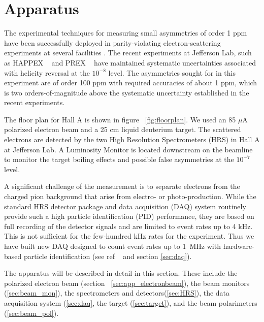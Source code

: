 
\section{Apparatus}\label{sec:apparatus}

\par The experimental techniques for measuring small 
asymmetries of order 1 ppm have been successfully deployed in
parity-violating electron-scattering experiments at several
facilities \cite{Prescott,batesc12,SAMPLEsff,HAPPEXsff,G0sff,prex}.
The recent experiments at Jefferson Lab, such as HAPPEX ~\cite{HAPPEXsff}
and PREX ~\cite{prex} have maintained systematic 
uncertainties associated with helicity
reversal at the $10^{-8}$ level.
The asymmetries sought for in this experiment are of order 100 ppm with
required accuracies of about 1 ppm, which is two orders-of-magnitude 
above the systematic uncertainty established in the recent experiments.

The floor plan for Hall A is shown in figure ~\ref{fig:floorplan}.
We used an 85 $\mu$A polarized electron beam and a 25 cm liquid
deuterium target.  The scattered electrons are detected by the two
High Resolution Spectrometers (HRS) in Hall A at Jefferson Lab.
A Luminosity Monitor is located downstream on the beamline to monitor 
the target boiling effects and possible false asymmetries at the $10^{-7}$ 
level.  

A significant challenge of the measurement 
is to separate electrons from the charged pion background 
that arise from electro- or photo-production. 
While the standard HRS detector package and data 
acquisition (DAQ) system routinely provide 
such a high particle identification (PID) performance, 
they are based on full recording 
of the detector signals and are limited to event rates up to 4 kHz.
This is not sufficient for the few-hundred kHz rates 
for the experiment. 
Thus we have built new DAQ designed to count event 
rates up to 1~MHz with hardware-based 
particle identification (see ref ~\cite{pvdis_nim} and section \ref{sec:daq}).

The apparatus will be described in detail in this section.
These include the polarized electron beam
(section ~\ref{sec:app_electronbeam}), 
the beam monitors (\ref{sec:beam_mon}),
the spectrometers and detectors(\ref{sec:HRS}), 
the data acquisition system (\ref{sec:daq}, 
the target (\ref{sec:target}),
and the beam polarimeters (\ref{sec:beam_pol}).


